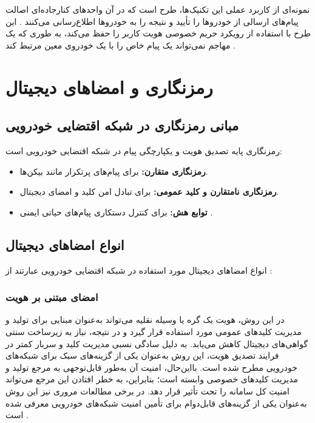 \documentclass[12pt,a4paper]{article}
\begin{document}
نمونه‌ای از کاربرد عملی این تکنیک‌ها، طرح  است که در آن واحدهای کنارجاده‌ای اصالت پیام‌های ارسالی از خودروها را تأیید و نتیجه را به خودروها اطلاع‌رسانی می‌کنند \cite{zhangRAISEEfficientRSUAided2008}. این طرح با استفاده از رویکرد  حریم خصوصی هویت کاربر را حفظ می‌کند، به طوری که یک مهاجم نمی‌تواند یک پیام خاص را با یک خودروی معین مرتبط کند \cite{zhangRAISEEfficientRSUAided2008}.

\section{رمزنگاری و امضاهای دیجیتال}

\subsection{مبانی رمزنگاری در شبکه اقتضایی خودرویی}

رمزنگاری پایه تصدیق هویت و یکپارچگی پیام در شبکه اقتضایی خودرویی است:

\begin{itemize}
  \item \textbf{رمزنگاری متقارن:} برای پیام‌های پرتکرار مانند بیکن‌ها.
  \item \textbf{رمزنگاری نامتقارن و کلید عمومی:} برای تبادل امن کلید و امضای دیجیتال.
  \item \textbf{توابع هش:} برای کنترل دستکاری پیام‌های حیاتی ایمنی \cite{VanetSecurityPrivacy}.
\end{itemize}

\subsection{انواع امضاهای دیجیتال}

انواع امضاهای دیجیتال مورد استفاده در شبکه اقتضایی خودرویی عبارتند از \cite{farsimadanReviewSecurityChallenges2025, VanetSecurityPrivacy}:

\subsubsection{امضای مبتنی بر هویت}
در این روش، هویت یک گره یا وسیله نقلیه می‌تواند به‌عنوان مبنایی برای تولید و مدیریت کلیدهای عمومی مورد استفاده قرار گیرد و در نتیجه، نیاز به زیرساخت سنتی گواهی‌های دیجیتال کاهش می‌یابد. به دلیل سادگی نسبی مدیریت کلید و سربار کمتر در فرایند تصدیق هویت، این روش به‌عنوان یکی از گزینه‌های سبک برای شبکه‌های خودرویی مطرح شده است. بااین‌حال، امنیت آن به‌طور قابل‌توجهی به مرجع تولید و مدیریت کلیدهای خصوصی وابسته است؛ بنابراین، به خطر افتادن این مرجع می‌تواند امنیت کل سامانه را تحت تأثیر قرار دهد. در برخی مطالعات مروری نیز این روش به‌عنوان یکی از گزینه‌های قابل‌دوام برای تأمین امنیت شبکه‌های خودرویی معرفی شده است \cite{VanetSecurityPrivacy}.
\end{document}
